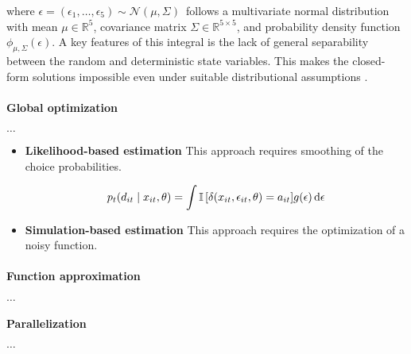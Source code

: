 where $\epsilon = (\epsilon_1, \dots, \epsilon_5) \sim \mathcal{N}(\mu, \Sigma)\,$ follows a multivariate normal distribution with mean $\mu \in \mathbb{R}^{5}$, covariance matrix $ \Sigma \in \mathbb{R}^{5 \times 5}$, and probability density function $\phi_{\mu, \Sigma}(\epsilon)$. A key features of this integral is the lack of general separability between the random and deterministic state variables. This makes the closed-form solutions impossible even under suitable distributional assumptions \citep{McFadden.1978,Rust.1987}.

\paragraph{Global optimization} $\hdots$


\begin{itemize}
  \item \textbf{Likelihood-based estimation} This approach requires smoothing of the choice probabilities.

  \begin{align*}
    p_t(d_{it} \mid x_{it}, \theta) = \int \mathbb{I}\, [ \delta(x_{it}, \epsilon_{it}, \theta) = a_{it} ] g(\epsilon) \mathop{}\!\mathrm{d} \epsilon
  \end{align*}

  \item \textbf{Simulation-based estimation} This approach requires the optimization of a noisy function.


\end{itemize}

\paragraph{Function approximation} $\hdots$

\paragraph{Parallelization} $\hdots$
